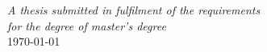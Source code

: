 \begin{titlepage}
\begin{center}
\large \textit{A thesis submitted in fulfilment of the requirements\\ for the degree of master's degree}\\[0.3cm] %

{\large \today}\\[4cm]

            
\end{center}
\end{titlepage}